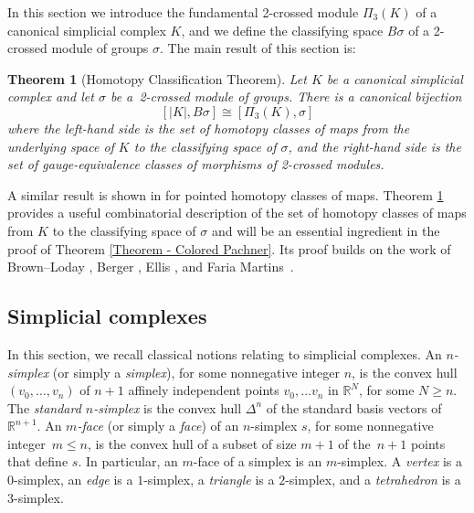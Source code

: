 \documentclass[a4paper, oneside]{amsart}
\makeatletter
\newcommand{\R}{\mathbb{R}}
\let\origsection\section
\renewcommand\section{\@ifstar{\starsection}{\nostarsection}}
\newcommand\nostarsection[1]
{\sectionprelude\origsection{#1}\sectionpostlude}
\newcommand\starsection[1]
{\sectionprelude\origsection*{#1}\sectionpostlude}
\newcommand\sectionprelude{%
  \vspace{1em}
}
\newcommand\sectionpostlude{%
  \vspace{1em}
}
\numberwithin{equation}{subsection}
\theoremstyle{referencedlemma}
\theoremstyle{plain} %
\newtheorem{thm}{Theorem}
\theoremstyle{remark}
\makeatother
\begin{document}
\section{The Homotopy Classification Theorem}\label{Section. Classification of homotopies}

\noindent In this section we introduce the fundamental 2-crossed module $\Pi_3(K)$ of a canonical simplicial complex $K$, and we define the classifying space $B\sigma$ of a 2-crossed module of groups $\sigma$.  The main result of this section is:

\begin{thm}[Homotopy Classification Theorem]\label{homotopy classification theorem}
Let $K$ be a canonical simplicial complex and let $\sigma$ be a~2-crossed module of groups. There is a canonical bijection
$$
[\lvert K\rvert , B\sigma] \cong [\Pi_3(K), \sigma]
$$
where the left-hand side is the set of homotopy classes of maps from the underlying space of $K$ to the classifying space of $\sigma$, and the right-hand side is the set of gauge-equivalence classes of morphisms of 2-crossed modules.
\end{thm}

A similar result is shown in \cite{martins_fundamental_2011} for pointed homotopy classes of maps.   Theorem \ref{homotopy classification theorem} provides a useful combinatorial description of the set of homotopy classes of maps from $K$ to the classifying space of $\sigma$ and will be an essential ingredient in the proof of Theorem \ref{Theorem - Colored Pachner}.  Its proof builds on the work of Brown--Loday \cite{brown_van_1987}, Berger \cite{bergerDoubleLoopSpaces1999}, Ellis \cite{ellis_crossed_1993}, and Faria Martins~\cite{martins_fundamental_2011}.

\subsection{Simplicial complexes}\label{simplicialcomplex}
In this section, we recall classical notions relating to simplicial complexes. An \emph{$n$-simplex} (or simply a \emph{simplex}), for some nonnegative integer $n$, is the convex hull $(v_0, \ldots, v_n)$ of $n+1$ affinely independent points $v_0, \ldots v_n$ in $\mathbb{R}^N$, for some $N\geqslant n$.  The \emph{standard $n$-simplex} is the convex hull $\Delta^n$ of the standard basis vectors of $\R^{n+1}$.  An \emph{$m$-face} (or simply a \emph{face}) of an $n$-simplex $s$, for some nonnegative integer~$m\leqslant n$, is the convex hull of a subset of size $m+1$ of the~$n+1$ points that define $s$.  In particular, an $m$-face of a simplex is an $m$-simplex.  A \emph{vertex} is a $0$-simplex, an \emph{edge} is a $1$-simplex, a \emph{triangle} is a $2$-simplex, and a \emph{tetrahedron} is a $3$-simplex.  
\end{document}
